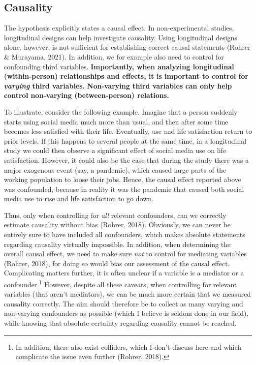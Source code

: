 \documentclass[
  man,mask]{apa7}
\begin{document}
\hypertarget{causality}{%
\subsection{Causality}\label{causality}}

The hypothesis explicitly states a causal effect.
In non-experimental studies, longitudinal designs can help investigate causality.
Using longitudinal designs alone, however, is not sufficient for establishing correct causal statements (Rohrer \& Murayama, 2021).
In addition, we for example also need to control for confounding third variables.
\textbf{Importantly, when analyzing longitudinal (within-person) relationships and effects, it is important to control for \emph{varying} third variables.}
\textbf{Non-varying third variables can only help control non-varying (between-person) relations.}

To illustrate, consider the following example.
Imagine that a person suddenly starts using social media much more than usual, and then after some time becomes less satisfied with their life.
Eventually, use and life satisfaction return to prior levels.
If this happens to several people at the same time, in a longitudinal study we could then observe a significant effect of social media use on life satisfaction.
However, it could also be the case that during the study there was a major exogenous event (say, a pandemic), which caused large parts of the working population to loose their jobs.
Hence, the causal effect reported above was confounded, because in reality it was the pandemic that caused both social media use to rise and life satisfaction to go down.

Thus, only when controlling for \emph{all} relevant confounders, can we correctly estimate causality without bias (Rohrer, 2018).
Obviously, we can never be entirely sure to have included all confounders, which makes absolute statements regarding causality virtually impossible.
In addition, when determining the overall causal effect, we need to make sure \emph{not} to control for mediating variables (Rohrer, 2018), for doing so would bias our assessment of the causal effect.
Complicating matters further, it is often unclear if a variable is a mediator or a confounder.\footnote{In addition, there also exist colliders, which I don't discuss here and which complicate the issue even further (Rohrer, 2018).}
However, despite all these caveats, when controlling for relevant variables (that aren't mediators), we can be much more certain that we measured causality correctly.
The aim should therefore be to collect as many varying and non-varying confounders as possible (which I believe is seldom done in our field), while knowing that absolute certainty regarding causality cannot be reached.
\end{document}
